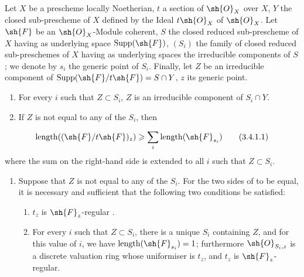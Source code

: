 \begin{proposition}[3.4.1]
\label{IV.3.4.1}
Let $X$ be a prescheme locally Noetherian, $t$ a section of $\sh{O}_X$ over $X$, $Y$ the closed sub-prescheme of $X$ defined by the Ideal $t\sh{O}_X$ of $\sh{O}_X$.
Let $\sh{F}$ be an $\sh{O}_X$-Module coherent, $S$ the closed reduced sub-prescheme of $X$ having as underlying space $\operatorname{Supp}(\sh{F})$, $(S_i)$ the family of closed reduced sub-preschemes of $X$ having as underlying spaces the irreducible components of $S$; we denote by $s_i$ the generic point of $S_i$.
Finally, let $Z$ be an irreducible component of $\operatorname{Supp}(\sh{F}/t\sh{F})=S\cap Y$, $z$ its generic point.
\begin{enumerate}[label=(\roman*)]
  \item For every $i$ such that $Z\subset S_i$, $Z$ is an irreducible component of $S_i\cap Y$.
  \item If $Z$ is not equal to any of the $S_i$, then
\end{enumerate}
\[
\label{IV.3.4.1.1}
\operatorname{length}((\sh{F}/t\sh{F})_z)\geqslant\sum_i\operatorname{length}(\sh{F}_{s_i})
\tag{3.4.1.1}
\]
where the sum on the right-hand side is extended to all $i$ such that $Z\subset S_i$.
\begin{enumerate}[resume,label=(\roman*)]
  \item Suppose that $Z$ is not equal to any of the $S_i$.
  For the two sides of  to be equal, it is necessary and sufficient that the following two conditions be satisfied:
  \begin{enumerate}[label=$\alpha$)]
    \item[\rm$\alpha$)] $t_z$ is $\sh{F}_z$-regular .
    \item[\rm$\beta$)] For every $i$ such that $Z\subset S_i$, there is a unique $S_i$ containing $Z$, and for this value of $i$, we have $\operatorname{length}(\sh{F}_{s_i})=1$; furthermore $\sh{O}_{S_i,z}$ is a discrete valuation ring whose uniformiser is $t_z$, and $t_z$ is $\sh{F}_z$-regular.
  \end{enumerate}
\end{enumerate}
\end{proposition}

